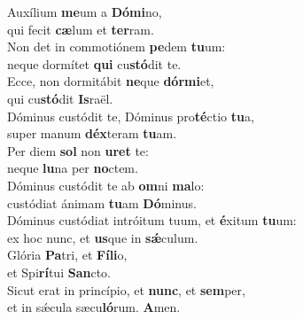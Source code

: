 \evenverse Auxílium \textbf{me}um a \textbf{Dó}\textbf{mi}no,~\*\\
\evenverse qui fecit \textbf{cæ}lum et \textbf{ter}ram.\\
\oddverse Non det in commotiónem \textbf{pe}dem \textbf{tu}um:~\*\\
\oddverse neque dormítet \textbf{qui} cu\textbf{stó}dit te.\\
\evenverse Ecce, non dormitábit \textbf{ne}que \textbf{dór}\textbf{mi}et,~\*\\
\evenverse qui cu\textbf{stó}dit \textbf{Is}raël.\\
\oddverse Dóminus custódit te, Dóminus pro\textbf{té}ctio \textbf{tu}a,~\*\\
\oddverse super manum \textbf{déx}teram \textbf{tu}am.\\
\evenverse Per diem \textbf{sol} non \textbf{u}\textbf{ret} te:~\*\\
\evenverse neque \textbf{lu}na per \textbf{no}ctem.\\
\oddverse Dóminus custódit te ab \textbf{om}ni \textbf{ma}lo:~\*\\
\oddverse custódiat ánimam \textbf{tu}am \textbf{Dó}minus.\\
\evenverse Dóminus custódiat intróitum tuum, et \textbf{é}xitum \textbf{tu}um:~\*\\
\evenverse ex hoc nunc, et \textbf{us}que in \textbf{sǽ}culum.\\
\oddverse Glória \textbf{Pa}tri, et \textbf{Fí}\textbf{li}o,~\*\\
\oddverse et Spi\textbf{rí}tui \textbf{San}cto.\\
\evenverse Sicut erat in princípio, et \textbf{nunc}, et \textbf{sem}per,~\*\\
\evenverse et in sǽcula sæcu\textbf{ló}rum. \textbf{A}men.\\

